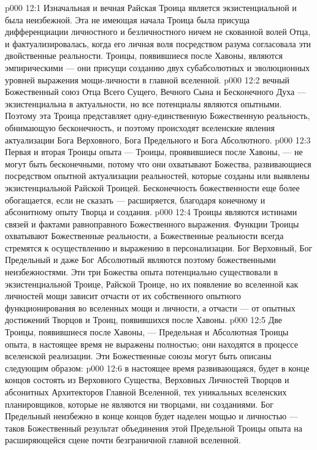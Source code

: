 \vs p000 12:1 Изначальная и вечная Райская Троица является экзистенциальной и была неизбежной. Эта не имеющая начала Троица была присуща дифференциации личностного и безличностного ничем не скованной волей Отца, и фактуализировалась, когда его личная воля посредством разума согласовала эти двойственные реальности. Троицы, появившиеся после Хавоны, являются эмпирическими --- они присущи созданию двух субабсолютных и эволюционных уровней выражения мощи\hyp{}личности в главной вселенной.
\vs p000 12:2 \pc {} вечный Божественный союз Отца Всего Сущего, Вечного Сына и Бесконечного Духа --- экзистенциальна в актуальности, но все потенциалы являются опытными. Поэтому эта Троица представляет одну\hyp{}единственную Божественную реальность, обнимающую бесконечность, и поэтому происходят вселенские явления актуализации Бога Верховного, Бога Предельного и Бога Абсолютного.
\vs p000 12:3 \pc Первая и вторая Троицы опыта --- Троицы, проявившиеся после Хавоны, --- не могут быть бесконечными, потому что они охватывают  Божества, развивающиеся посредством опытной актуализации реальностей, которые созданы или выявлены экзистенциальной Райской Троицей. Бесконечность божественности еще более обогащается, если не сказать --- расширяется, благодаря конечному и абсонитному опыту Творца и создания.
\vs p000 12:4 Троицы являются истинами связей и фактами равноправного Божественного выражения. Функции Троицы охватывают Божественные реальности, а Божественные реальности всегда стремятся к осуществлению и выражению в персонализации. Бог Верховный, Бог Предельный и даже Бог Абсолютный являются поэтому божественными неизбежностями. Эти три Божества опыта потенциально существовали в экзистенциальной Троице, Райской Троице, но их появление во вселенной как личностей мощи зависит отчасти от их собственного опытного функционирования во вселенных мощи и личности, а отчасти --- от опытных достижений Творцов и Троиц, появившихся после Хавоны.
\vs p000 12:5 \pc Две Троицы, появившиеся после Хавоны, --- Предельная и Абсолютная Троицы опыта, в настоящее время не выражены полностью; они находятся в процессе вселенской реализации. Эти Божественные союзы могут быть описаны следующим образом:
\vs p000 12:6 \bibnobreakspace {} в настоящее время развивающаяся, будет в конце концов состоять из Верховного Существа, Верховных Личностей Творцов и абсонитных Архитекторов Главной Вселенной, тех уникальных вселенских планировщиков, которые не являются ни творцами, ни созданиями. Бог Предельный неизбежно в конце концов будет наделен мощью и личностью --- таков Божественный результат объединения этой Предельной Троицы опыта на расширяющейся сцене почти безграничной главной вселенной.
